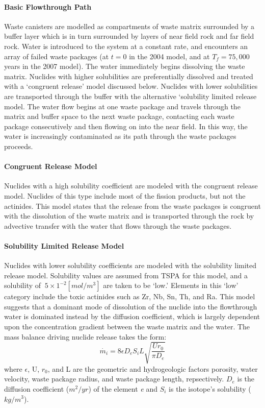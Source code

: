 \paragraph{Basic Flowthrough Path}
Waste canisters are modelled as compartments of waste matrix surrounded by a buffer layer which is 
in turn surrounded by layers of near field rock and far field rock. Water is introduced to the 
system at a constant rate, and encounters an array of failed waste packages (at $t=0$ in the 2004 
model, and at $T_f=75,000$ years in the 2007 model). The water immediately begins dissolving the 
waste matrix. Nuclides with higher solubilities are preferentially dissolved and treated with a 
`congruent release' model discussed below. Nuclides with lower solubilities are transported through 
the buffer with the alternative `solubility limited release model. The water flow begins at one 
waste package and travels through the matrix and buffer space to the next waste package, contacting 
each waste package consecutively and then flowing on into the near field. In this way, the water is 
increasingly contaminated as its path through the waste packages proceeds.  \paragraph{Congruent 
Release Model} Nuclides with a high solubility coefficient are modeled with the congruent release 
model. Nuclides of this type include most of the fission products, but not the actinides. This model 
states that the release from the waste packages is congruent with the dissolution of the waste 
matrix and is transported through the rock by advective transfer with the water that flows through 
the waste packages.  \paragraph{Solubility Limited Release Model}
Nuclides with lower solubility coefficients are modeled with the solubility limited release model. 
Solubility values are assumed from TSPA for this model, and a solubility of $~5\times 1^{-2} 
[mol/m^3]$ are taken to be `low.' Elements in this `low' category include the toxic actinides such 
as Zr, Nb, Sn, Th, and Ra. This model suggests that a dominant mode of dissolution of the nuclide 
into the flowthrough water is dominated instead by the diffusion coefficient, which is largely 
dependent upon the concentration gradient between the waste matrix and the water. The mass balance 
driving nuclide release takes the form:
\begin{equation}
\dot{m_i}=8\epsilon D_eS_iL\sqrt{\frac{Ur_0}{\pi D_e}}
\end{equation}
where $\epsilon$, U, $r_0$, and L are the geometric and hydrogeologic factors porosity, water 
velocity, waste package radius, and waste package length, repsectively. $D_e$ is the diffusion 
coefficient ($m^2/yr$) of the element \emph{e} and $S_i$ is the isotope's solubility ($kg/m^3$).

